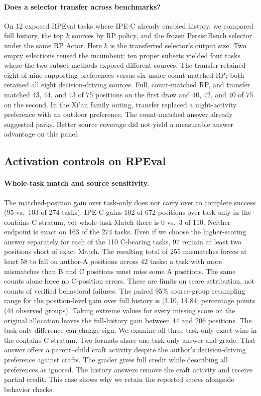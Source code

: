 \documentclass[11pt]{article}
\begin{document}
\paragraph{Does a selector transfer across benchmarks?}
On 12 exposed RPEval tasks where IPE-C already enabled history, we compared full history, the top $k$ sources by RP policy, and the frozen PersistBench selector under the same RP Actor. Here $k$ is the transferred selector's output size. Two empty selections reused the incumbent; ten proper subsets yielded four tasks where the two subset methods exposed different sources. The transfer retained eight of nine supporting preferences versus six under count-matched RP; both retained all eight decision-driving sources. Full, count-matched RP, and transfer matched 43, 44, and 43 of 75 positions on the first draw and 40, 42, and 40 of 75 on the second. In the Xi'an family outing, transfer replaced a night-activity preference with an outdoor preference. The count-matched answer already suggested parks. Better source coverage did not yield a measurable answer advantage on this panel.

\subsection{Activation controls on RPEval}

\paragraph{Whole-task match and source sensitivity.}
The matched-position gain over task-only does not carry over to complete success (95 vs.\ 103 of 274 tasks). IPE-C gains 102 of 672 positions over task-only in the contains-C stratum, yet whole-task Match there is 0 vs.\ 3 of 110. Neither endpoint is exact on 163 of the 274 tasks. Even if we choose the higher-scoring answer separately for each of the 110 C-bearing tasks, 97 remain at least two positions short of exact Match. The resulting total of 255 mismatches forces at least 58 to fall on author-A positions across 42 tasks: a task with more mismatches than B and C positions must miss some A positions. The same counts alone force no C-position errors. These are limits on score attribution, not counts of verified behavioral failures. The paired 95\% source-group resampling range for the position-level gain over full history is [3.10, 14.84] percentage points (44 observed groups). Taking extreme values for every missing score on the original allocation leaves the full-history gain between 44 and 206 positions. The task-only difference can change sign. We examine all three task-only exact wins in the contains-C stratum. Two formats share one task-only answer and grade. That answer offers a parent--child craft activity despite the author's decision-driving preference against crafts. The grader gives full credit while describing all preferences as ignored. The history answers remove the craft activity and receive partial credit. This case shows why we retain the reported scores alongside behavior checks.
\end{document}
